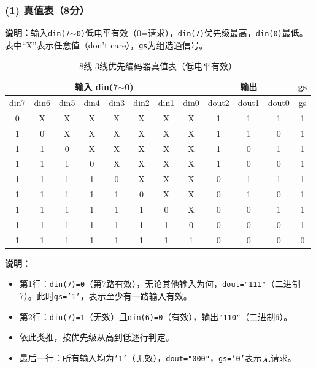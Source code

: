 \subsubsection*{(1) 真值表（8分）}

\noindent\textbf{说明：}输入\texttt{din(7$\sim$0)}低电平有效（0=请求），\texttt{din(7)}优先级最高，\texttt{din(0)}最低。表中“X”表示任意值（don’t care），\texttt{gs}为组选通信号。

\begin{table}[h]
\centering
\caption{8线-3线优先编码器真值表（低电平有效）}
\label{tab:priority-encoder}
\begin{tabular}{|c|c|c|c|c|c|c|c||c|c|c||c|}
\hline
\multicolumn{8}{|c||}{\textbf{输入 din(7$\sim$0)}} & \multicolumn{3}{c||}{\textbf{输出}} & \textbf{gs} \\
\hline
din7 & din6 & din5 & din4 & din3 & din2 & din1 & din0 & dout2 & dout1 & dout0 & gs \\
\hline
0 & X & X & X & X & X & X & X & 1 & 1 & 1 & 1 \\
\hline
1 & 0 & X & X & X & X & X & X & 1 & 1 & 0 & 1 \\
\hline
1 & 1 & 0 & X & X & X & X & X & 1 & 0 & 1 & 1 \\
\hline
1 & 1 & 1 & 0 & X & X & X & X & 1 & 0 & 0 & 1 \\
\hline
1 & 1 & 1 & 1 & 0 & X & X & X & 0 & 1 & 1 & 1 \\
\hline
1 & 1 & 1 & 1 & 1 & 0 & X & X & 0 & 1 & 0 & 1 \\
\hline
1 & 1 & 1 & 1 & 1 & 1 & 0 & X & 0 & 0 & 1 & 1 \\
\hline
1 & 1 & 1 & 1 & 1 & 1 & 1 & 0 & 0 & 0 & 0 & 1 \\
\hline
1 & 1 & 1 & 1 & 1 & 1 & 1 & 1 & 0 & 0 & 0 & 0 \\
\hline
\end{tabular}
\end{table}

\noindent\textbf{说明：}
\begin{itemize}
  \item 第1行：\texttt{din(7)=0}（第7路有效），无论其他输入为何，\texttt{dout="111"}（二进制7）。此时\texttt{gs='1'}，表示至少有一路输入有效。
  \item 第2行：\texttt{din(7)=1}（无效）且\texttt{din(6)=0}（有效），输出\texttt{"110"}（二进制6）。
  \item 依此类推，按优先级从高到低逐行判定。
  \item 最后一行：所有输入均为\texttt{'1'}（无效），\texttt{dout="000"}，\texttt{gs='0'}表示无请求。
\end{itemize}

